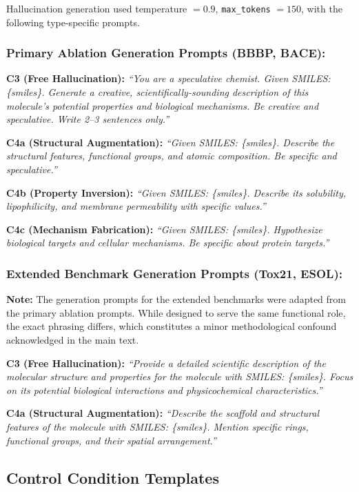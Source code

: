 Hallucination generation used temperature $= 0.9$, \texttt{max\_tokens} $= 150$, with the following type-specific prompts.

\subsubsection*{Primary Ablation Generation Prompts (BBBP, BACE):}

\textbf{C3 (Free Hallucination):}
\textit{``You are a speculative chemist. Given SMILES: \{smiles\}. Generate a creative, scientifically-sounding description of this molecule's potential properties and biological mechanisms. Be creative and speculative. Write 2--3 sentences only.''}

\textbf{C4a (Structural Augmentation):}
\textit{``Given SMILES: \{smiles\}. Describe the structural features, functional groups, and atomic composition. Be specific and speculative.''}

\textbf{C4b (Property Inversion):}
\textit{``Given SMILES: \{smiles\}. Describe its solubility, lipophilicity, and membrane permeability with specific values.''}

\textbf{C4c (Mechanism Fabrication):}
\textit{``Given SMILES: \{smiles\}. Hypothesize biological targets and cellular mechanisms. Be specific about protein targets.''}

\subsubsection*{Extended Benchmark Generation Prompts (Tox21, ESOL):}
\textbf{Note:} The generation prompts for the extended benchmarks were adapted from the primary ablation prompts. While designed to serve the same functional role, the exact phrasing differs, which constitutes a minor methodological confound acknowledged in the main text.

\textbf{C3 (Free Hallucination):}
\textit{``Provide a detailed scientific description of the molecular structure and properties for the molecule with SMILES: \{smiles\}. Focus on its potential biological interactions and physicochemical characteristics.''}

\textbf{C4a (Structural Augmentation):}
\textit{``Describe the scaffold and structural features of the molecule with SMILES: \{smiles\}. Mention specific rings, functional groups, and their spatial arrangement.''}

\subsection{Control Condition Templates}

